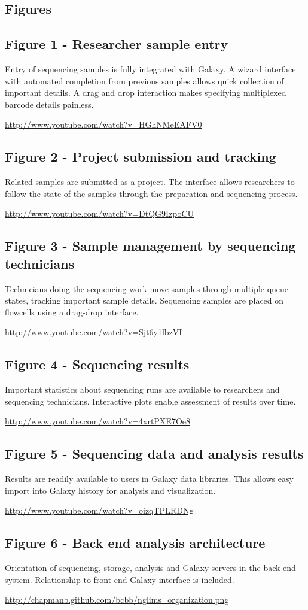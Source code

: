 \documentclass[10pt]{bmc_article}
\newenvironment{bmcformat}{\begin{raggedright}\baselineskip20pt\sloppy\setboolean{publ}{false}}{\end{raggedright}\baselineskip20pt\sloppy}
\begin{document}
\begin{bmcformat}
\section*{Figures}
\subsection*{Figure 1 - Researcher sample entry}
Entry of sequencing samples is fully integrated with Galaxy. A
wizard interface with automated completion from previous samples
allows quick collection of important details. A drag and drop
interaction makes specifying multiplexed barcode details painless.

\url{http://www.youtube.com/watch?v=HGhNMeEAFV0}

\subsection*{Figure 2 - Project submission and tracking}
Related samples are submitted as a project. The interface allows
researchers to follow the state of the samples through the
preparation and sequencing process.

\url{http://www.youtube.com/watch?v=DtQG9IzpoCU}

\subsection*{Figure 3 - Sample management by sequencing technicians}
Technicians doing the sequencing work move samples through multiple
queue states, tracking important sample details. Sequencing samples
are placed on flowcells using a drag-drop interface.

\url{http://www.youtube.com/watch?v=Sjt6y1lbzVI}

\subsection*{Figure 4 - Sequencing results}
Important statistics about sequencing runs are available to
researchers and sequencing technicians. Interactive plots enable
assessment of results over time.

\url{http://www.youtube.com/watch?v=4xrtPXE7Oe8}

\subsection*{Figure 5 - Sequencing data and analysis results}
Results are readily available to users in Galaxy data libraries. This
allows easy import into Galaxy history for analysis and visualization.

\url{http://www.youtube.com/watch?v=oizqTPLRDNg}

\subsection*{Figure 6 - Back end analysis architecture}
Orientation of sequencing, storage, analysis and Galaxy servers in the
back-end system. Relationship to front-end Galaxy interface is
included.

\url{http://chapmanb.github.com/bcbb/nglims_organization.png}

\end{bmcformat}
\end{document}
